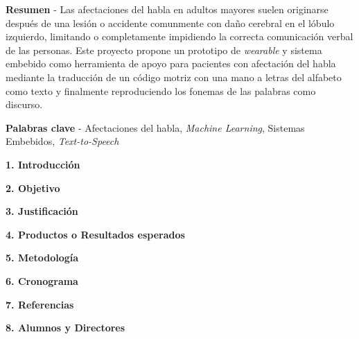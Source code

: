 \documentclass[10.5pt]{report}
\begin{document}


\hfill\break
\justifying
\textbf{Resumen} - Las afectaciones del habla en adultos mayores suelen originarse después de una lesión o accidente comunmente con daño cerebral en el lóbulo izquierdo, limitando o completamente impidiendo la correcta comunicación verbal de las personas. Este proyecto propone un prototipo de \textit{wearable} y sistema embebido como herramienta de apoyo para pacientes con afectación del habla mediante la traducción de un código motriz con una mano a letras del alfabeto como texto y finalmente reproduciendo los fonemas de las palabras como discurso.

\hfill \break
\textbf{Palabras clave} - Afectaciones del habla, \textit{Machine Learning}, Sistemas Embebidos, \textit{Text-to-Speech}

\hfill \break
{\fontsize{12}{14}\textbf{1. Introducción}}
\hfill \break


\hfill \break
{\fontsize{12}{14}\textbf{2. Objetivo}}
\hfill \break
\justifying


\hfill \break
{\fontsize{12}{14}\textbf{3. Justificación}}
\hfill \break
\justifying


\hfill \break
{\fontsize{12}{14}\textbf{4. Productos o Resultados esperados}}
\hfill \break
\justifying


\newpage
\hfill \break
{\fontsize{12}{14}\textbf{5. Metodología}}
\hfill \break
\justifying


\newpage
\hfill \break
{\fontsize{12}{14}\textbf{6. Cronograma}}
\hfill \break
\justifying



\newpage
\hfill \break
{\fontsize{12}{14}\textbf{7. Referencias}}

\hfill \break


\newpage

{\fontsize{12}{14}\textbf{8. Alumnos y Directores}}


\end{document}
